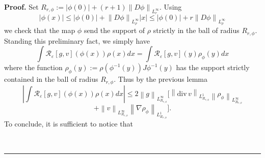 \documentclass[a4paper,10pt]{article}
\newenvironment{proof}[1][Proof]{\textbf{#1.} }{\ \rule{0.5em}{0.5em}}
\begin{document}
\begin{proof}
Set
$
R_{r,\phi}:=\left|  \phi\left(  0\right)  \right|  +\left(  r+1\right)
\left\|  D\phi\right\|  _{L_{r}^{\infty}}
$.
Using
\[
\left|  \phi\left(  x\right)  \right|  \leq\left|  \phi\left(  0\right)
\right|  +\left\|  D\phi\right\|  _{L_{\rho}^{\infty}}\left|  x\right|
\leq\left|  \phi\left(  0\right)  \right|  +r\left\|  D\phi\right\|
_{L_{\rho}^{\infty}}%
\]
we  check that the map $\phi$ send the support of $\rho$ strictly in the ball of radius
$R_{r,\phi}$.
%
%
Standing this preliminary fact, we simply have
\[
\int\mathcal{R}_{\varepsilon}\left[  g,v\right]  \left(  \phi\left(  x\right)
\right)  \rho\left(  x\right)  dx=\int\mathcal{R}_{\varepsilon}\left[
g,v\right]  \left(  y\right)  \rho_{\phi}\left(  y\right)  dx
\]
where the function
$
\rho_{\phi}\left(  y\right)  :=\rho\left(  \phi^{-1}\left(  y\right)  \right)
J\phi^{-1}\left(  y\right)
$
has the support strictly contained in the ball of radius $R_{r,\phi}$. Thus by
the previous lemma
$$
\left|  \int\mathcal{R}_{\varepsilon}\left[  g,v\right]  \left(
\phi\left( x\right)  \right)  \rho\left(  x\right)  dx\right|
\leq2\left\|  g\right\| _{L_{R_{r,\phi}}^{\infty}}\Big[  \left\|
{\mathrm{div}\, }v\right\|
_{L_{R_{r,\phi}}^{1}}\left\|  \rho_{\phi}\right\|  _{L_{R_{r,\phi}}^{\infty}%
}$$ $$  +\left\|  v\right\|  _{L_{R_{r,\phi}}^{\infty}}\left\|
\nabla\rho_{\phi }\right\|  _{L_{R_{r,\phi}}^{1}}\Big]  .
$$
To conclude, it is sufficient to notice that

\end{proof}
\end{document}
